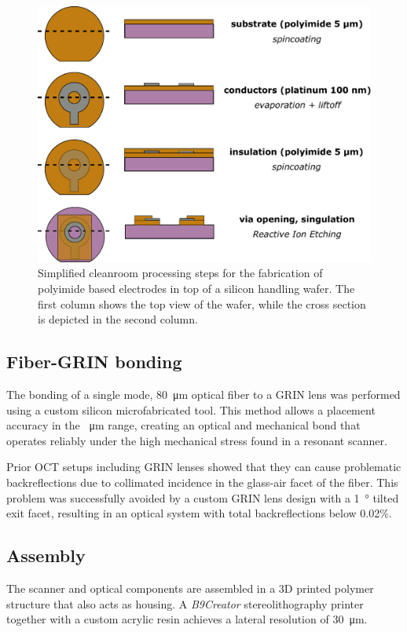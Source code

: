 \documentclass[10pt]{iopart}
\begin{document}
\begin{figure}[h!]\centering \includegraphics[width=\columnwidth]{figures/PIprocess.pdf}
      \caption{Simplified cleanroom processing steps for the fabrication of polyimide based electrodes in top of a silicon handling wafer. The first column shows the top view of the wafer, while the cross section is depicted in the second column.}
      \label{fig:PIprocess}
\end{figure}

\subsection{Fiber-GRIN bonding}
The bonding of a single mode, \SI{80}{\micro\meter} optical fiber to a GRIN lens was performed using a custom silicon microfabricated tool. This method allows a placement accuracy in the \SI{}{\micro\meter} range, creating an optical and mechanical bond that operates reliably under the high mechanical stress found in a resonant scanner. 

Prior OCT setups including GRIN lenses showed that they can cause problematic backreflections due to collimated incidence in the glass-air facet of the fiber. This problem was successfully avoided by a custom GRIN lens design with a \SI{1}{\degree} tilted exit facet, resulting in an optical system with total backreflections below 0.02\%.


\subsection{Assembly}
The scanner and optical components are assembled in a 3D printed polymer structure that also acts as housing. A \textit{B9Creator} stereolithography printer together with a custom acrylic resin achieves a lateral resolution of \SI{30}{\micro\meter}.
\end{document}
